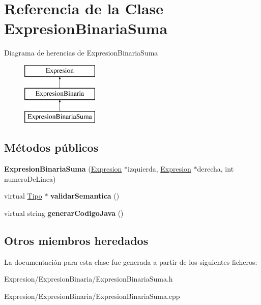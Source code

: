\hypertarget{class_expresion_binaria_suma}{\section{Referencia de la Clase Expresion\-Binaria\-Suma}
\label{class_expresion_binaria_suma}
}
Diagrama de herencias de Expresion\-Binaria\-Suma\begin{figure}[H]
\begin{center}
\leavevmode
\includegraphics[height=3.000000cm]{class_expresion_binaria_suma}
\end{center}
\end{figure}
\subsection*{Métodos públicos}
\begin{DoxyCompactItemize}
\item 
\hypertarget{class_expresion_binaria_suma_a0b780585b562e896a101fd786371f5e0}{{\bfseries Expresion\-Binaria\-Suma} (\hyperlink{class_expresion}{Expresion} $\ast$izquierda, \hyperlink{class_expresion}{Expresion} $\ast$derecha, int numero\-De\-Linea)}\label{class_expresion_binaria_suma_a0b780585b562e896a101fd786371f5e0}

\item 
\hypertarget{class_expresion_binaria_suma_a19c9f4cc48473a7fa461ebc9a0b1938c}{virtual \hyperlink{class_tipo}{Tipo} $\ast$ {\bfseries validar\-Semantica} ()}\label{class_expresion_binaria_suma_a19c9f4cc48473a7fa461ebc9a0b1938c}

\item 
\hypertarget{class_expresion_binaria_suma_a82884b94e59727c09e7107ba5675d30b}{virtual string {\bfseries generar\-Codigo\-Java} ()}\label{class_expresion_binaria_suma_a82884b94e59727c09e7107ba5675d30b}

\end{DoxyCompactItemize}
\subsection*{Otros miembros heredados}


La documentación para esta clase fue generada a partir de los siguientes ficheros\-:\begin{DoxyCompactItemize}
\item 
Expresion/\-Expresion\-Binaria/Expresion\-Binaria\-Suma.\-h\item 
Expresion/\-Expresion\-Binaria/Expresion\-Binaria\-Suma.\-cpp\end{DoxyCompactItemize}

